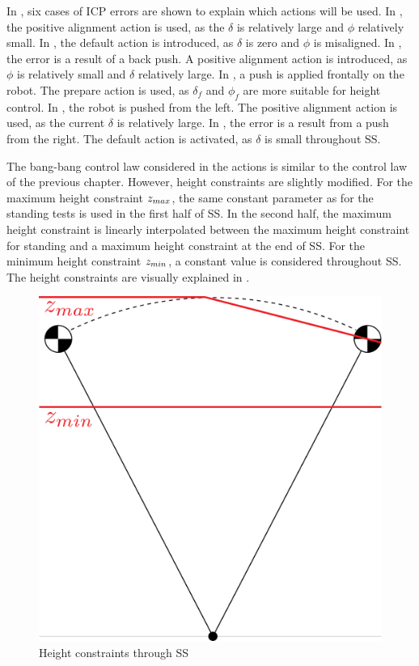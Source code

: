 In , six cases of \ac{ICP} errors are shown to explain which actions will be used. In , the positive alignment action is used, as the $\delta$ is relatively large and $\phi$ relatively small. In , the default action is introduced, as $\delta$ is zero and $\phi$ is misaligned. In , the error is a result of a back push. A positive alignment action is introduced, as $\phi$ is relatively small and $\delta$ relatively large. In , a push is applied frontally on the robot. The prepare action is used, as $\delta_f$ and $\phi_f$ are more suitable for height control. In , the robot is pushed from the left. The positive alignment action is used, as the current $\delta$ is relatively large. In , the error is a result from a push from the right. The default action is activated, as $\delta$ is small throughout \ac{SS}.

The bang-bang control law considered in the actions is similar to the control law of the previous chapter. However, height constraints are slightly modified. For the maximum height constraint $z_{max}$, the same constant parameter as for the standing tests is used in the first half of \ac{SS}. In the second half, the maximum height constraint is linearly interpolated between the maximum height constraint for standing and a maximum height constraint at the end of \ac{SS}.  For the minimum height constraint $z_{min}$, a constant value is considered throughout \ac{SS}. The height constraints are visually explained in .
\begin{figure}
\centering
  \includegraphics[width=.4\linewidth]{STYLESTUFF/heightconstraints.png}
   \caption{Height constraints through \acf{SS}}
    \label{fig:heightconstraints}
\end{figure} 
